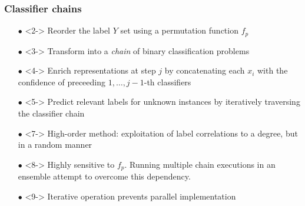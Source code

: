 \documentclass{beamer}
\begin{document}
\begin{frame}
\frametitle{Classifier chains}
\begin{itemize}
\item[$\bullet$] <2-> Reorder the label $Y$ set using a permutation function $f_p$ 
\item[$\bullet$] <3-> Transform into a \emph{chain} of binary classification problems
\item[$\bullet$] <4-> Enrich representations at step $j$ by concatenating each $x_i$ with the confidence of preceeding $1,\dots,j-1$-th classifiers
\item[$\bullet$] <5-> Predict relevant labels for unknown instances by iteratively traversing the classifier chain
\end{itemize}

\begin{itemize}
\item[$\bullet$] <7-> High-order method: exploitation of label correlations to a degree, but in a random manner
\item[$\bullet$] <8-> Highly sensitive to $f_p$. Running multiple chain executions in an ensemble attempt to overcome this dependency.
\item[$\bullet$] <9-> Iterative operation prevents parallel implementation
\end{itemize}
\end{frame}
\end{document}
